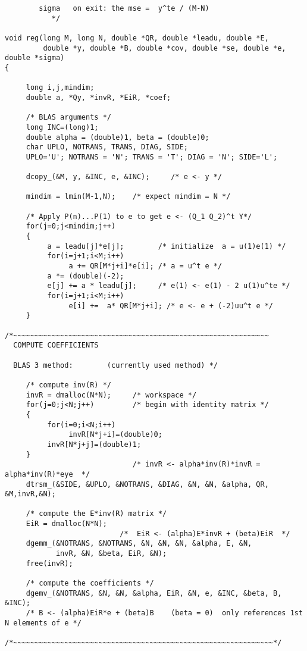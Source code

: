 \documentclass{article}
\begin{document}
\begin{verbatim}
        sigma   on exit: the mse =  y^te / (M-N)
           */
        
void reg(long M, long N, double *QR, double *leadu, double *E, 
         double *y, double *B, double *cov, double *se, double *e, double *sigma)
{

     long i,j,mindim;
     double a, *Qy, *invR, *EiR, *coef;

     /* BLAS arguments */
     long INC=(long)1;
     double alpha = (double)1, beta = (double)0;
     char UPLO, NOTRANS, TRANS, DIAG, SIDE; 
     UPLO='U'; NOTRANS = 'N'; TRANS = 'T'; DIAG = 'N'; SIDE='L';
  
     dcopy_(&M, y, &INC, e, &INC);     /* e <- y */

     mindim = lmin(M-1,N);    /* expect mindim = N */

     /* Apply P(n)...P(1) to e to get e <- (Q_1 Q_2)^t Y*/
     for(j=0;j<mindim;j++)
     {
          a = leadu[j]*e[j];        /* initialize  a = u(1)e(1) */
          for(i=j+1;i<M;i++)
               a += QR[M*j+i]*e[i]; /* a = u^t e */
          a *= (double)(-2);
          e[j] += a * leadu[j];     /* e(1) <- e(1) - 2 u(1)u^te */
          for(i=j+1;i<M;i++)
               e[i] +=  a* QR[M*j+i]; /* e <- e + (-2)uu^t e */
     }

/*~~~~~~~~~~~~~~~~~~~~~~~~~~~~~~~~~~~~~~~~~~~~~~~~~~~~~~~~~~~~
  COMPUTE COEFFICIENTS
  
  BLAS 3 method:        (currently used method) */

     /* compute inv(R) */
     invR = dmalloc(N*N);     /* workspace */
     for(j=0;j<N;j++)         /* begin with identity matrix */
     {
          for(i=0;i<N;i++)
               invR[N*j+i]=(double)0;
          invR[N*j+j]=(double)1;
     }
                              /* invR <- alpha*inv(R)*invR = alpha*inv(R)*eye  */
     dtrsm_(&SIDE, &UPLO, &NOTRANS, &DIAG, &N, &N, &alpha, QR, &M,invR,&N);

     /* compute the E*inv(R) matrix */
     EiR = dmalloc(N*N);      
                           /*  EiR <- (alpha)E*invR + (beta)EiR  */
     dgemm_(&NOTRANS, &NOTRANS, &N, &N, &N, &alpha, E, &N, 
            invR, &N, &beta, EiR, &N); 
     free(invR);

     /* compute the coefficients */
     dgemv_(&NOTRANS, &N, &N, &alpha, EiR, &N, e, &INC, &beta, B, &INC);
     /* B <- (alpha)EiR*e + (beta)B    (beta = 0)  only references 1st N elements of e */

/*~~~~~~~~~~~~~~~~~~~~~~~~~~~~~~~~~~~~~~~~~~~~~~~~~~~~~~~~~~~~~*/
     

\end{verbatim}
\end{document}
